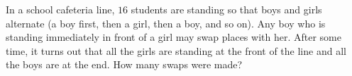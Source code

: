 In a school cafeteria line, $16$ students are standing so that boys and girls alternate (a boy first, then a girl, then a boy, and so on). Any boy who is standing immediately in front of a girl may swap places with her. After some time, it turns out that all the girls are standing at the front of the line and all the boys are at the end. How many swaps were made?
